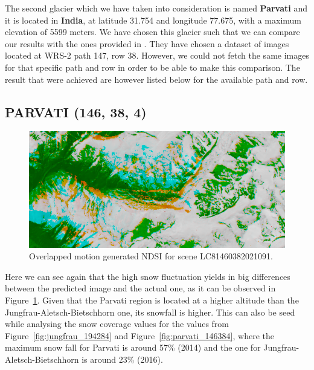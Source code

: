 \documentclass[12pt, a4paper]{report}
\begin{document}
	\vfill
	\newpage{}
	
	\par The second glacier which we have taken into consideration is named \textbf{Parvati} and it is located in \textbf{India}, at latitude 31.754 and longitude 77.675, with a maximum elevation of 5599 meters. We have chosen this glacier such that we can compare our results with the ones provided in \cite{parvati}. They have chosen a dataset of images located at WRS-2 path 147, row 38. However, we could not fetch the same images for that specific path and row in order to be able to make this comparison. The result that were achieved are however listed below for the available path and row.
	
	\subsection{PARVATI (146, 38, 4)}
		
	\begin{figure}[h!]
		\centering
		\includegraphics[width=\linewidth]{../images/experiment_1460384_image.png}
		\caption{Overlapped motion generated NDSI for scene LC81460382021091.}
		\label{fig:experiment_1460384_image}
	\end{figure}

	
	Here we can see again that the high snow fluctuation yields in big differences between the predicted image and the actual one, as it can be observed in Figure~\ref{fig:experiment_1460384_image}. Given that the Parvati region is located at a higher altitude than the Jungfrau-Aletsch-Bietschhorn one, its snowfall is higher. This can also be seed while analysing the snow coverage values for the values from Figure~\ref{fig:jungfrau_194284} and Figure~\ref{fig:parvati_146384}, where the maximum snow fall for Parvati is around 57\% (2014) and the one for Jungfrau-Aletsch-Bietschhorn is around 23\% (2016).
\end{document}

